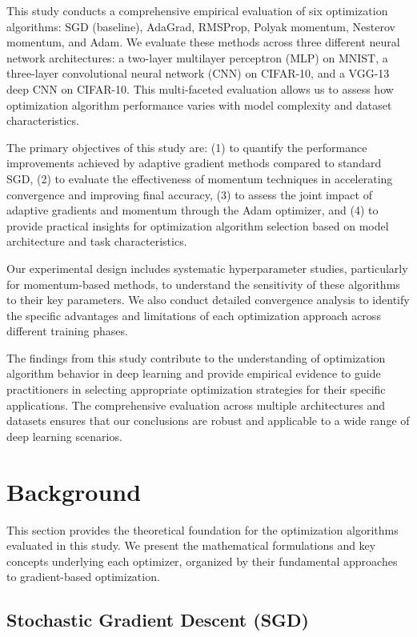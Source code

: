 \documentclass[12pt]{article}
\begin{document}
This study conducts a comprehensive empirical evaluation of six optimization algorithms: SGD (baseline), AdaGrad, RMSProp, Polyak momentum, Nesterov momentum, and Adam. We evaluate these methods across three different neural network architectures: a two-layer multilayer perceptron (MLP) on MNIST, a three-layer convolutional neural network (CNN) on CIFAR-10, and a VGG-13 deep CNN on CIFAR-10. This multi-faceted evaluation allows us to assess how optimization algorithm performance varies with model complexity and dataset characteristics.

The primary objectives of this study are: (1) to quantify the performance improvements achieved by adaptive gradient methods compared to standard SGD, (2) to evaluate the effectiveness of momentum techniques in accelerating convergence and improving final accuracy, (3) to assess the joint impact of adaptive gradients and momentum through the Adam optimizer, and (4) to provide practical insights for optimization algorithm selection based on model architecture and task characteristics.

Our experimental design includes systematic hyperparameter studies, particularly for momentum-based methods, to understand the sensitivity of these algorithms to their key parameters. We also conduct detailed convergence analysis to identify the specific advantages and limitations of each optimization approach across different training phases.

The findings from this study contribute to the understanding of optimization algorithm behavior in deep learning and provide empirical evidence to guide practitioners in selecting appropriate optimization strategies for their specific applications. The comprehensive evaluation across multiple architectures and datasets ensures that our conclusions are robust and applicable to a wide range of deep learning scenarios.


\section{Background}

This section provides the theoretical foundation for the optimization algorithms evaluated in this study. We present the mathematical formulations and key concepts underlying each optimizer, organized by their fundamental approaches to gradient-based optimization.

\subsection{Stochastic Gradient Descent (SGD)}
\end{document}
